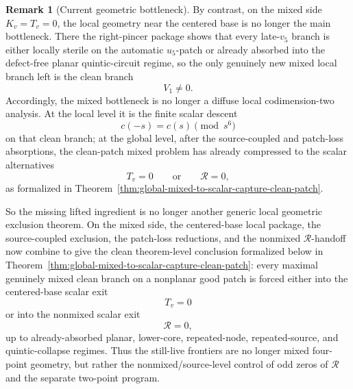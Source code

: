 \documentclass[11pt,a4paper]{amsart}
\theoremstyle{plain}
\theoremstyle{definition}
\newtheorem{remark}[theorem]{Remark}
\begin{document}
\begin{remark}[Current geometric bottleneck]
By contrast, on the mixed side $K_v=T_v=0$, the local geometry near the
centered base is no longer the main bottleneck. There the right-pincer package
shows that every late-$v_5$ branch is either locally sterile on the automatic
$u_5$-patch or already absorbed into the defect-free planar quintic-circuit
regime, so the only genuinely new mixed local branch left is the clean branch
\[
V_1\neq 0.
\]
Accordingly, the mixed bottleneck is no longer a diffuse local codimension-two
analysis. At the local level it is the finite scalar descent
\[
c(-s)=c(s)\pmod{s^6}
\]
on that clean branch; at the global level, after the source-coupled and
patch-loss absorptions, the clean-patch mixed problem has already compressed to
the scalar alternatives
\[
T_v=0
\qquad\text{or}\qquad
\mathcal R=0,
\]
as formalized in
Theorem~\ref{thm:global-mixed-to-scalar-capture-clean-patch}.

So the missing lifted ingredient is no longer another generic local geometric
exclusion theorem. On the mixed side, the centered-base local package, the
source-coupled exclusion, the patch-loss reductions, and the nonmixed
$\mathcal R$-handoff now combine to give the clean theorem-level conclusion
formalized below in
Theorem~\ref{thm:global-mixed-to-scalar-capture-clean-patch}: every maximal
genuinely mixed clean branch on a nonplanar good patch is forced either into
the centered-base scalar exit
\[
T_v=0
\]
or into the nonmixed scalar exit
\[
\mathcal R=0,
\]
up to already-absorbed planar, lower-core, repeated-node, repeated-source, and
quintic-collapse regimes. Thus the still-live frontiers are no longer mixed
four-point geometry, but rather the nonmixed/source-level control of odd zeros
of $\mathcal R$ and the separate two-point program.
\end{remark}
\end{document}
